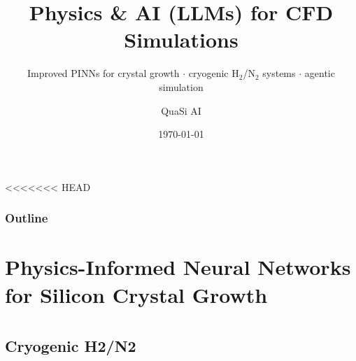\documentclass[aspectratio=169,10pt,t]{beamer}
\title[Physics \& AI for CFD]{Physics \& AI (LLMs) for CFD Simulations}
\subtitle{Improved PINNs for crystal growth $\cdot$ cryogenic H$_2$/N$_2$ systems $\cdot$ agentic simulation}
\author{QuaSi AI}
\date{\today}
\begin{document}
<<<<<<< HEAD
\begin{frame}
\titlepage %
\end{frame}

\begin{frame}
\frametitle{Outline} %
\tableofcontents %
\end{frame}



\section{Physics-Informed Neural Networks for Silicon Crystal Growth}
\section{ }
\section{ }

\subsection{Cryogenic H2/N2}
\end{document}
